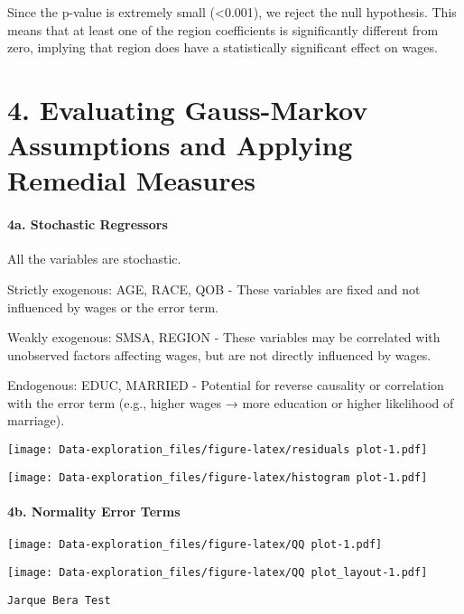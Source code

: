 \documentclass[
]{article}
\begin{document}
Since the p-value is extremely small (\textless0.001), we reject the
null hypothesis. This means that at least one of the region coefficients
is significantly different from zero, implying that region does have a
statistically significant effect on wages.

\section{\texorpdfstring{\textbf{4. Evaluating Gauss-Markov Assumptions
and Applying Remedial
Measures}}{4. Evaluating Gauss-Markov Assumptions and Applying Remedial Measures}}\label{evaluating-gauss-markov-assumptions-and-applying-remedial-measures}

\paragraph{\texorpdfstring{\textbf{4a. Stochastic
Regressors}}{4a. Stochastic Regressors}}\label{a.-stochastic-regressors}

All the variables are stochastic.

Strictly exogenous: AGE, RACE, QOB - These variables are fixed and not
influenced by wages or the error term.

Weakly exogenous: SMSA, REGION - These variables may be correlated with
unobserved factors affecting wages, but are not directly influenced by
wages.

Endogenous: EDUC, MARRIED - Potential for reverse causality or
correlation with the error term (e.g., higher wages → more education or
higher likelihood of marriage).

\texttt{[image: Data-exploration\_files/figure-latex/residuals plot-1.pdf]}

\texttt{[image: Data-exploration\_files/figure-latex/histogram plot-1.pdf]}

\paragraph{\texorpdfstring{\textbf{4b. Normality Error
Terms}}{4b. Normality Error Terms}}\label{b.-normality-error-terms}

\texttt{[image: Data-exploration\_files/figure-latex/QQ plot-1.pdf]}

\texttt{[image: Data-exploration\_files/figure-latex/QQ plot\_layout-1.pdf]}

\begin{verbatim}
Jarque Bera Test
\end{verbatim}
\end{document}
